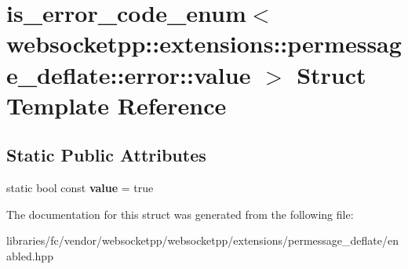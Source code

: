 \hypertarget{structis__error__code__enum_3_01websocketpp_1_1extensions_1_1permessage__deflate_1_1error_1_1value_01_4}{}\section{is\+\_\+error\+\_\+code\+\_\+enum$<$ websocketpp\+:\+:extensions\+:\+:permessage\+\_\+deflate\+:\+:error\+:\+:value $>$ Struct Template Reference}
\label{structis__error__code__enum_3_01websocketpp_1_1extensions_1_1permessage__deflate_1_1error_1_1value_01_4}
\subsection*{Static Public Attributes}
\begin{DoxyCompactItemize}
\item 
\mbox{\label{structis__error__code__enum_3_01websocketpp_1_1extensions_1_1permessage__deflate_1_1error_1_1value_01_4_a1ceffb56a9c084320554bdf454b3b88f}} 
static bool const {\bfseries value} = true
\end{DoxyCompactItemize}


The documentation for this struct was generated from the following file\+:\begin{DoxyCompactItemize}
\item 
libraries/fc/vendor/websocketpp/websocketpp/extensions/permessage\+\_\+deflate/enabled.\+hpp\end{DoxyCompactItemize}
